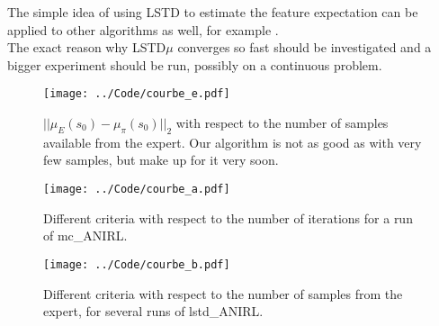\documentclass{article}
\begin{document}
The simple idea of using LSTD to estimate the feature expectation can be applied to other algorithms as well, for example \cite{abbeel2004apprenticeship,syed2008apprenticeship,syed2008game,ziebart2008maximum}.\\

The exact reason why LSTD$\mu$ converges so fast should be investigated and a bigger experiment should be run, possibly on a continuous problem.\\
\begin{figure}
\texttt{[image: ../Code/courbe\_e.pdf]}
\caption{$||\mu_E(s_0)-\mu_\pi(s_0)||_2$ with respect to the number of samples available from the expert. Our algorithm is not as good as \citet{abbeel2004apprenticeship} with very few samples, but make up for it very soon.}
\label{fig:E}
\end{figure}
\label{sec:perf}
\begin{figure}
\texttt{[image: ../Code/courbe\_a.pdf]}
\caption{Different criteria with respect to the number of iterations for a run of mc\_ANIRL.}
\label{fig:A}
\end{figure}
\begin{figure}
\texttt{[image: ../Code/courbe\_b.pdf]}
\caption{Different criteria with respect to the number of samples from the expert, for several runs of lstd\_ANIRL.}
\label{fig:B}
\end{figure}


\end{document}
